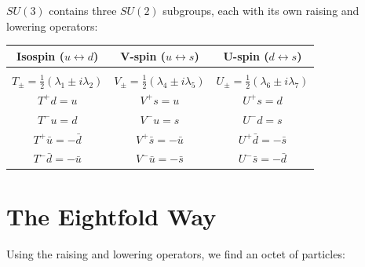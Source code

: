 \documentclass[12pt]{article}
\begin{document}
$SU(3)$ contains three $SU(2)$ subgroups, each with its own raising
and lowering operators:
\begin{center}
\begin{tabular}{ccc}
  Isospin ($u\leftrightarrow d$) & V-spin ($u\leftrightarrow s$) & U-spin ($d\leftrightarrow s$) \\
  \hline \\[-6pt]
  $T_\pm = \tfrac{1}{2}(\lambda_1 \pm i\lambda_2)$ &
  $V_\pm = \tfrac{1}{2}(\lambda_4 \pm i\lambda_5)$ &
  $U_\pm = \tfrac{1}{2}(\lambda_6 \pm i\lambda_7)$ \\[7pt]
  $T^+d = u$ & $V^+s = u$ & $U^+s = d$ \\
  $T^-u = d$ & $V^-u = s$ & $U^-d = s$ \\
  $T^+\bar{u} = -\bar{d}$ & $V^+\bar{s} = -\bar{u}$ & $U^+\bar{d} = -\bar{s}$ \\
  $T^-\bar{d} = -\bar{u}$ & $V^-\bar{u} = -\bar{s}$ & $U^-\bar{s} = -\bar{d}$ \\
\end{tabular}
\end{center}


\section*{The Eightfold Way}

Using the raising and lowering operators, we find an octet of
particles:
\end{document}
